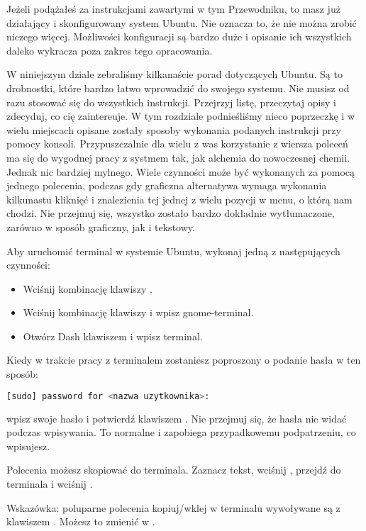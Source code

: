 Jeżeli podążałeś za instrukcjami zawartymi w tym Przewodniku, to masz już działający i skonfigurowany system Ubuntu. Nie oznacza to, że nie można zrobić niczego więcej. Możliwości konfiguracji są bardzo duże i opisanie ich wszystkich daleko wykracza poza zakres tego opracowania.

W niniejszym dziale zebraliśmy kilkanaście porad dotyczących Ubuntu. Są to drobnostki, które bardzo łatwo wprowadzić do swojego systemu. Nie musisz od razu stosować się do wszystkich instrukcji. Przejrzyj listę, przeczytaj opisy i zdecyduj, co cię zaintereuje. W tym rozdziale podnieśliśmy nieco poprzeczkę i w wielu miejscach opisane zostały sposoby wykonania podanych instrukcji przy pomocy konsoli. Przypuszczalnie dla wielu z was korzystanie z wiersza poleceń ma się do wygodnej pracy z systmem tak, jak alchemia do nowoczesnej chemii. Jednak nic bardziej mylnego. Wiele czynności może być wykonanych za pomocą jednego polecenia, podczas gdy graficzna alternatywa wymaga wykonania kilkunastu kliknięć i znalezienia tej jednej z wielu pozycji w menu, o którą nam chodzi. Nie przejmuj się, wszystko zostało bardzo dokładnie wytłumaczone, zarówno w sposób graficzny, jak i tekstowy.

Aby uruchomić terminal w systemie Ubuntu, wykonaj jedną z następujących czynności:
\begin{itemize}
\item Wciśnij kombinację klawiszy .
\item Wciśnij kombinację klawiszy  i wpisz \textcolor{ubuntu_orange}{gnome-terminal}.
\item Otwórz Dash klawiszem  i wpisz \textcolor{ubuntu_orange}{terminal}.
\end{itemize}

Kiedy w trakcie pracy z terminalem zostaniesz poproszony o podanie hasła w ten sposób:
\begin{lstlisting}[language=bash]
[sudo] password for <nazwa uzytkownika>:
\end{lstlisting}
\noindent wpisz swoje hasło i potwierdź klawiszem \keys{\returnwin}. Nie przejmuj się, że hasła nie widać podczas wpisywania. To normalne i zapobiega przypadkowemu podpatrzeniu, co wpisujesz.

Polecenia możesz skopiować do terminala. Zaznacz tekst, wciśnij , przejdź do terminala i wciśnij .

Wskazówka: poluparne polecenia kopiuj/wklej w terminalu wywoływane są z klawiszem . Możesz to zmienić w .
